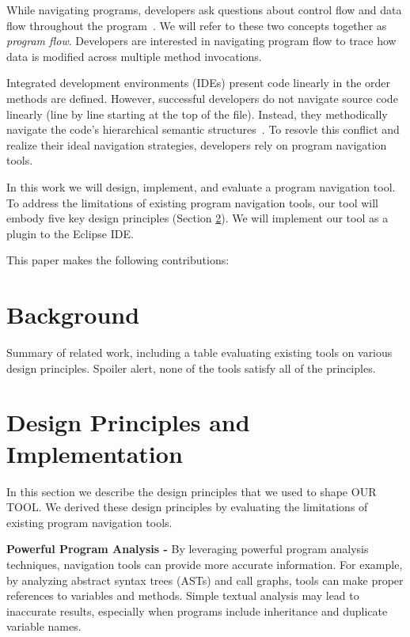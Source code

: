 \documentclass[conference]{IEEEtran}
\newcommand{\toolName}{OUR TOOL}
\begin{document}
While navigating programs, developers ask questions about control flow and data flow throughout the program~\cite{latoza2010hard, Smith2015}. We will refer to these two concepts together as \textit{program flow}. Developers are interested in navigating program flow to trace how data is modified across multiple method invocations.

Integrated development environments (IDEs) present code linearly in the order methods are defined. However, successful developers do not navigate source code linearly (line by line starting at the top of the file). Instead, they methodically navigate the code's hierarchical semantic structures~\cite{robillard2004investigate}. To resovle this conflict and realize their ideal navigation strategies, developers rely on program navigation tools. 


In this work we will design, implement, and evaluate a program navigation tool.
To address the limitations of existing program navigation tools, our tool will embody five key design principles (Section \ref{DesignPrinciples}). We will implement our tool as a plugin to the Eclipse IDE. 

This paper makes the following contributions:


\section{Background}
Summary of related work, including a table evaluating existing tools on various design principles.
Spoiler alert, none of the tools satisfy all of the principles.


\section{Design Principles and Implementation}
\label{DesignPrinciples}
In this section we describe the design principles that we used to shape \toolName. We derived these design principles by evaluating the limitations of existing program navigation tools.
 
\vspace{1em} 
\noindent\textbf{Powerful Program Analysis -}
By leveraging powerful program analysis techniques, navigation tools can provide more accurate information.
For example, by analyzing abstract syntax trees (ASTs) and call graphs, tools can make proper references to variables and methods. 
Simple textual analysis may lead to inaccurate results, especially when programs include inheritance and duplicate variable names.
\end{document}
